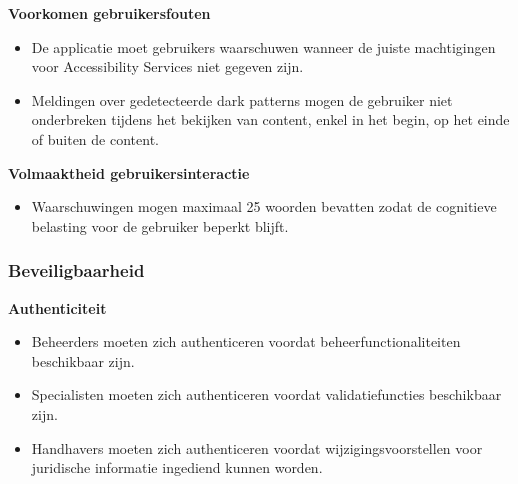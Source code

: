 \vspace{0.5em}

\hspace*{1.5em}\textbf{Voorkomen gebruikersfouten}

\begin{itemize}
    \item De applicatie moet gebruikers waarschuwen wanneer de juiste machtigingen voor Accessibility Services niet gegeven zijn.
    \item Meldingen over gedetecteerde dark patterns mogen de gebruiker niet onderbreken tijdens het bekijken van content, enkel in het begin, op het einde of buiten de content.
\end{itemize}

\vspace{0.5em}

\hspace*{1.5em}\textbf{Volmaaktheid gebruikersinteractie}

\begin{itemize}
    \item Waarschuwingen mogen maximaal 25 woorden bevatten zodat de cognitieve belasting voor de gebruiker beperkt blijft.
\end{itemize}

\vspace{1em}

\subsubsection{\textcolor{customlightgray}{Beveiligbaarheid}}
\vspace{1em}

\textcolor{customlightgray}{\hspace*{1.5em}\textbf{Authenticiteit}}

\begin{itemize}
    \item \textcolor{customlightgray}{Beheerders moeten zich authenticeren voordat beheerfunctionaliteiten beschikbaar zijn.}
    \item \textcolor{customlightgray}{Specialisten moeten zich authenticeren voordat validatiefuncties beschikbaar zijn.}
    \item \textcolor{customlightgray}{Handhavers moeten zich authenticeren voordat wijzigingsvoorstellen voor juridische informatie ingediend kunnen worden.}
\end{itemize}

\vspace{1em}

